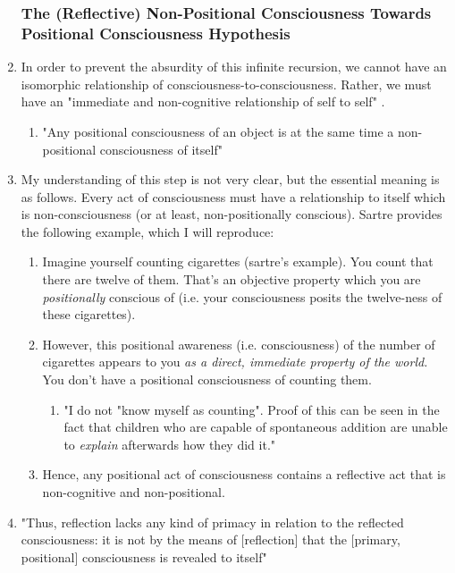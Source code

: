 \begin{enumerate}
  \subsubsection{The (Reflective) Non-Positional Consciousness Towards Positional Consciousness Hypothesis}
  \item In order to prevent the absurdity of this infinite recursion, we cannot have an isomorphic relationship of consciousness-to-consciousness. Rather, we must have an "immediate and non-cognitive relationship of self to self" \autocite[11]{sartre}.
  \begin{enumerate}
    \item "Any positional consciousness of an object is at the same time a non-positional consciousness of itself"
  \end{enumerate}
  \item My understanding of this step is not very clear, but the essential meaning is as follows. Every act of consciousness must have a relationship to itself which is non-consciousness (or at least, non-positionally conscious). Sartre provides the following example, which I will reproduce:
  \begin{enumerate}
    \item Imagine yourself counting cigarettes (sartre's example). You count that there are twelve of them. That's an objective property which you are \emph{positionally} conscious of (i.e. your consciousness posits the twelve-ness of these cigarettes).
    \item However, this positional awareness (i.e. consciousness) of the number of cigarettes appears to you \emph{as a direct, immediate property of the world.} You don't have a positional consciousness of counting them.
    \begin{enumerate}
      \item "I do not "know myself as counting". Proof of this can be seen in the fact that children who are capable of spontaneous addition are unable to \emph{explain} afterwards how they did it."
    \end{enumerate}
    \item Hence, any positional act of consciousness contains a reflective act that is non-cognitive and non-positional.
  \end{enumerate}
  \item "Thus, reflection lacks any kind of primacy in relation to the reflected consciousness: it is not by the means of [reflection] that the [primary, positional] consciousness is revealed to itself" \autocite[12]{sartre}

\end{enumerate}
